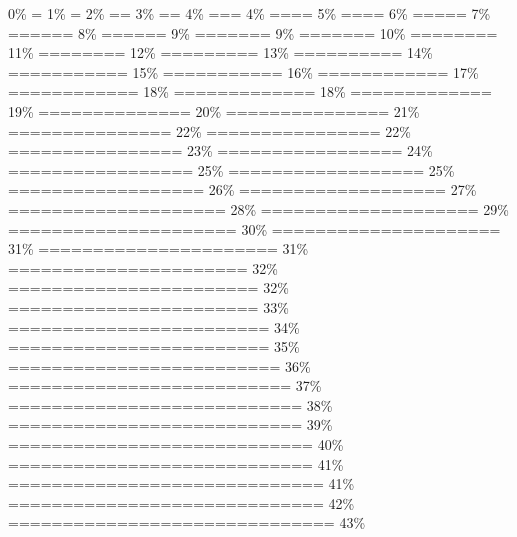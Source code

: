 \documentclass[
]{article}
\begin{document}
\textbar{} \textbar{} \textbar{} 0\% \textbar{} \textbar= \textbar{} 1\%
\textbar{} \textbar= \textbar{} 2\% \textbar{} \textbar== \textbar{} 3\%
\textbar{} \textbar== \textbar{} 4\% \textbar{} \textbar=== \textbar{}
4\% \textbar{} \textbar==== \textbar{} 5\% \textbar{} \textbar====
\textbar{} 6\% \textbar{} \textbar===== \textbar{} 7\% \textbar{}
\textbar====== \textbar{} 8\% \textbar{} \textbar====== \textbar{} 9\%
\textbar{} \textbar======= \textbar{} 9\% \textbar{} \textbar=======
\textbar{} 10\% \textbar{} \textbar======== \textbar{} 11\% \textbar{}
\textbar======== \textbar{} 12\% \textbar{} \textbar========= \textbar{}
13\% \textbar{} \textbar========== \textbar{} 14\% \textbar{}
\textbar=========== \textbar{} 15\% \textbar{} \textbar===========
\textbar{} 16\% \textbar{} \textbar============ \textbar{} 17\%
\textbar{} \textbar============ \textbar{} 18\% \textbar{}
\textbar============= \textbar{} 18\% \textbar{} \textbar=============
\textbar{} 19\% \textbar{} \textbar============== \textbar{} 20\%
\textbar{} \textbar=============== \textbar{} 21\% \textbar{}
\textbar=============== \textbar{} 22\% \textbar{}
\textbar================ \textbar{} 22\% \textbar{}
\textbar================ \textbar{} 23\% \textbar{}
\textbar================= \textbar{} 24\% \textbar{}
\textbar================= \textbar{} 25\% \textbar{}
\textbar================== \textbar{} 25\% \textbar{}
\textbar================== \textbar{} 26\% \textbar{}
\textbar=================== \textbar{} 27\% \textbar{}
\textbar==================== \textbar{} 28\% \textbar{}
\textbar==================== \textbar{} 29\% \textbar{}
\textbar===================== \textbar{} 30\% \textbar{}
\textbar===================== \textbar{} 31\% \textbar{}
\textbar====================== \textbar{} 31\% \textbar{}
\textbar====================== \textbar{} 32\% \textbar{}
\textbar======================= \textbar{} 32\% \textbar{}
\textbar======================= \textbar{} 33\% \textbar{}
\textbar======================== \textbar{} 34\% \textbar{}
\textbar======================== \textbar{} 35\% \textbar{}
\textbar========================= \textbar{} 36\% \textbar{}
\textbar========================== \textbar{} 37\% \textbar{}
\textbar=========================== \textbar{} 38\% \textbar{}
\textbar=========================== \textbar{} 39\% \textbar{}
\textbar============================ \textbar{} 40\% \textbar{}
\textbar============================ \textbar{} 41\% \textbar{}
\textbar============================= \textbar{} 41\% \textbar{}
\textbar============================= \textbar{} 42\% \textbar{}
\textbar============================== \textbar{} 43\% \textbar{}
\end{document}
